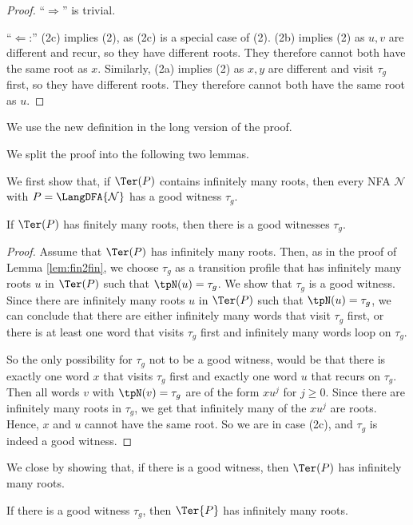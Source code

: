 \documentclass[a4paper,USenglish,cleveref,autoref,thm-restate]{lipics-v2021}
\newcommand{\mc}[1]{\ensuremath{\mathcal{#1}}}
\newcommand{\N}{\mc{N}}
\begin{document}
{\begin{proof}
    ``$\Rightarrow$'' is trivial.

    ``$\Leftarrow$:'' (2c) implies (2), as (2c) is a special case of (2).
    (2b) implies (2) as $u,v$ are different and recur, so they have different roots. They therefore cannot both have the same root as $x$.
    Similarly, (2a) implies (2) as $x,y$ are different and visit $\tau_g$ first, so they have different roots. They therefore cannot both have the same root as $u$.
\end{proof}

We use the new definition in the long version of the proof.

We split the proof into the following two lemmas.

We first show that, if $\Ter(P)$ contains infinitely many roots, then every NFA $\N$ with $P = \LangDFA{\N}$ has a good witness $\tau_g$.

\begin{lemma}
    If $\Ter(P)$ has finitely many roots, then there is a good witnesses $\tau_g$.
\end{lemma}

\begin{proof}
    Assume that $\Ter(P)$ has infinitely many roots.
    Then, as in the proof of Lemma \ref{lem:fin2fin}, we choose $\tau_g$ as a transition profile that has infinitely many roots $u$ in $\Ter(P)$ such that $\tpN(u) = \tau_g$. We show that $\tau_g$ is a good witness.
    Since there are infinitely many roots $u$ in $\Ter(P)$ such that $\tpN(u) = \tau_g$, we can conclude that there are either infinitely many words that visit $\tau_g$ first, or there is at least one word that visits $\tau_g$ first and infinitely many words loop on $\tau_g$.

    So the only possibility for $\tau_g$ not to be a good witness, would be that there is exactly one word $x$ that visits $\tau_g$ first and exactly one word $u$ that recurs on $\tau_g$. Then all words $v$ with $\tpN(v) = \tau_g$ are of the form $xu^j$ for $j \ge 0$. Since there are infinitely many roots in $\tau_g$, we get that infinitely many of the $xu^j$ are roots. Hence, $x$ and $u$ cannot have the same root. So we are in case (2c), and $\tau_g$ is indeed a good witness.
\end{proof}

We close by showing that, if there is a good witness, then $\Ter(P)$ has infinitely many roots.
\begin{lemma}
    If there is a good witness $\tau_g$, then
    $\Ter{P}$ has infinitely many roots.
\end{lemma}

}
\end{document}
